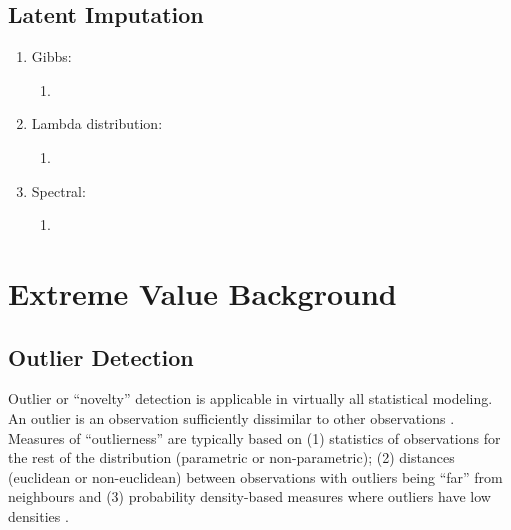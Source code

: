 \FloatBarrier
\subsection{Latent Imputation}
\label{subsec:01latent}


\begin{enumerate}

    \item Gibbs:
          \begin{enumerate}
              \item \cite{barnett2015multivariate,silva2018multivariate,silva2018enhanced,arroyo2020iterative,madani2021enhanced}
          \end{enumerate}

    \item Lambda distribution:
          \begin{enumerate}
              \item \cite{hadavand2023spatial}
          \end{enumerate}

    \item Spectral:
          \begin{enumerate}
              \item \cite{lauzon2020calibration,lauzon2020sequential,lauzon2023joint}
          \end{enumerate}

\end{enumerate}


\FloatBarrier
\section{Extreme Value Background}
\label{sec:01evtreview}

\FloatBarrier
\subsection{Outlier Detection}
\label{subsec:01outlier}

Outlier or ``novelty'' detection is applicable in virtually all statistical modeling. An outlier is an observation sufficiently dissimilar to other observations \citep{barnett1984outliers}. Measures of ``outlierness'' are typically based on (1) statistics of observations for the rest of the distribution (parametric or non-parametric); (2) distances (euclidean or non-euclidean) between observations with outliers being ``far'' from neighbours and (3) probability density-based measures where outliers have low densities \citep{hodge2004survey}.

